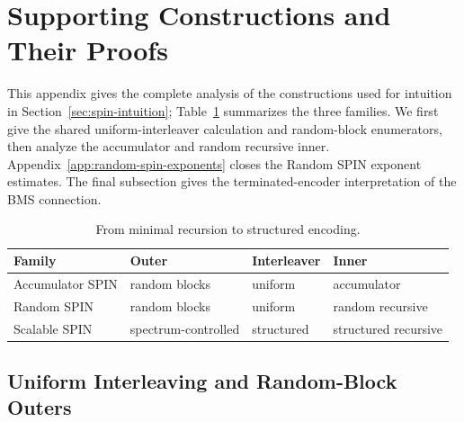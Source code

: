 \section{Supporting Constructions and Their Proofs}
\label{app:supporting-constructions}

This appendix gives the complete analysis of the constructions used for
intuition in Section~\ref{sec:spin-intuition};
Table~\ref{tab:spin-families} summarizes the three families. We first give the
shared uniform-interleaver calculation and random-block enumerators, then
analyze the accumulator and random recursive inner.
Appendix~\ref{app:random-spin-exponents} closes the Random SPIN exponent
estimates. The final subsection gives the terminated-encoder interpretation
of the BMS connection.

\begin{table}[!htbp]
  \centering
  \caption{From minimal recursion to structured encoding.}
  \label{tab:spin-families}
\begin{tabular}{@{}llll@{}}
    \toprule
    Family & Outer & Interleaver & Inner \\
    \midrule
    Accumulator SPIN & random blocks & uniform & accumulator \\
    Random SPIN & random blocks & uniform & random recursive \\
    Scalable SPIN & spectrum-controlled & structured & structured recursive \\
    \bottomrule
  \end{tabular}
  \end{table}

\subsection{Uniform Interleaving and Random-Block Outers}
\label{app:supporting-framework}







